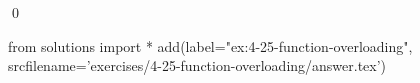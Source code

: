 
\begin{ex}
  \label{ex:4-25-function-overloading}
  
  \qed
\end{ex}
\begin{python0}
from solutions import *
add(label="ex:4-25-function-overloading",
    srcfilename='exercises/4-25-function-overloading/answer.tex')
\end{python0}

